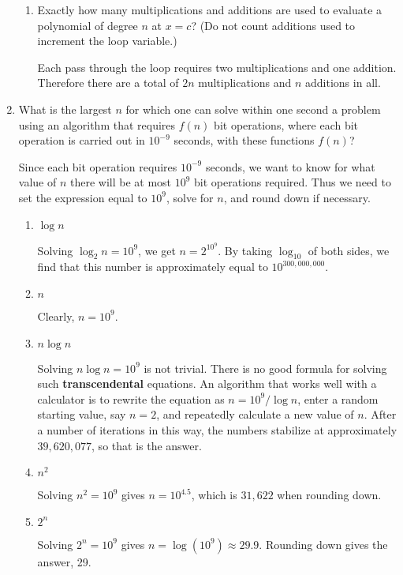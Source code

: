 \documentclass[11pt]{article}
\begin{document}
\begin{enumerate}[label=\textbf{\arabic*.}]
\begin{enumerate}[label=\textbf{\alph*)}]
		\item Exactly how many multiplications and additions are used to evaluate a polynomial of degree $n$ at $x = c$? (Do not count additions used to increment the loop variable.)
		
		Each pass through the loop requires two multiplications and one addition. Therefore there are a total of $2n$ multiplications and $n$ additions in all.
	\end{enumerate}

	\item What is the largest $n$ for which one can solve within one second a problem using an algorithm that requires $f(n)$ bit operations, where each bit operation is carried out in $10^{-9}$ seconds, with these functions $f(n)$?
	
	Since each bit operation requires $10^{-9}$ seconds, we want to know for what value of $n$ there will be at most $10^9$ bit operations required. Thus we need to set the expression equal to $10^9$, solve for $n$, and round down if necessary.
	
	\begin{enumerate}[label=\textbf{\alph*)}]
		\item $\log n$
		
		Solving $\log_2 n = 10^9$, we get $n = 2^{10^9}$. By taking $\log_{10}$ of both sides, we find that this number is approximately equal to $10^{300,000,000}$.
		
		\item $n$
		
		Clearly, $n = 10^9$.
		
		\item $n \log n$
		
		Solving $n \log n = 10^9$ is not trivial. There is no good formula for solving such \textbf{transcendental} equations. An algorithm that works well with a calculator is to rewrite the equation as $n = 10^9 / \log n$, enter a random starting value, say $n = 2$, and repeatedly calculate a new value of $n$. After a number of iterations in this way, the numbers stabilize at approximately $39,620,077$, so that is the answer.
		
		\item $n^2$
		
		Solving $n^2 = 10^9$ gives $n = 10^{4.5}$, which is $31,622$ when rounding down.
		
		\item $2^n$
		
		Solving $2^n = 10^9$ gives $n = \log(10^9) \approx 29.9$. Rounding down gives the answer, 29.
		

\end{enumerate}
\end{enumerate}
\end{document}
